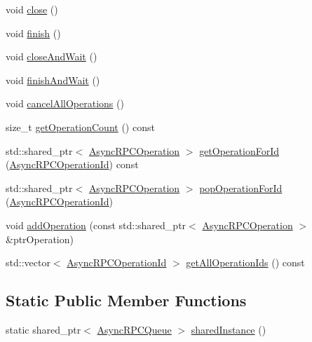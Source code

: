 \begin{DoxyCompactItemize}
\item 
void \mbox{\hyperlink{class_async_r_p_c_queue_a233be6530494331038507ad60f1d8428}{close}} ()
\item 
void \mbox{\hyperlink{class_async_r_p_c_queue_acc9201529321a452826979ea11697b21}{finish}} ()
\item 
void \mbox{\hyperlink{class_async_r_p_c_queue_a1744ae79a6f3ac3cb98404f8a1489cd4}{close\+And\+Wait}} ()
\item 
void \mbox{\hyperlink{class_async_r_p_c_queue_aaa0414a23dee050656280306b9cf1589}{finish\+And\+Wait}} ()
\item 
void \mbox{\hyperlink{class_async_r_p_c_queue_aa22de6b56261448ff6d468e27f630d7b}{cancel\+All\+Operations}} ()
\item 
size\+\_\+t \mbox{\hyperlink{class_async_r_p_c_queue_ab170c29699beeb0f95791953ce2c66d3}{get\+Operation\+Count}} () const
\item 
std\+::shared\+\_\+ptr$<$ \mbox{\hyperlink{class_async_r_p_c_operation}{Async\+R\+P\+C\+Operation}} $>$ \mbox{\hyperlink{class_async_r_p_c_queue_a4d8d32008c611e4cd7ba122a6dda28c6}{get\+Operation\+For\+Id}} (\mbox{\hyperlink{asyncrpcoperation_8h_a1fb3337bad8503e6f6823aa1bcd7191c}{Async\+R\+P\+C\+Operation\+Id}}) const
\item 
std\+::shared\+\_\+ptr$<$ \mbox{\hyperlink{class_async_r_p_c_operation}{Async\+R\+P\+C\+Operation}} $>$ \mbox{\hyperlink{class_async_r_p_c_queue_a716d9609df548d21d3bd3cca130aa811}{pop\+Operation\+For\+Id}} (\mbox{\hyperlink{asyncrpcoperation_8h_a1fb3337bad8503e6f6823aa1bcd7191c}{Async\+R\+P\+C\+Operation\+Id}})
\item 
void \mbox{\hyperlink{class_async_r_p_c_queue_a921166cf7a5f25723c13b2f01d35edaa}{add\+Operation}} (const std\+::shared\+\_\+ptr$<$ \mbox{\hyperlink{class_async_r_p_c_operation}{Async\+R\+P\+C\+Operation}} $>$ \&ptr\+Operation)
\item 
std\+::vector$<$ \mbox{\hyperlink{asyncrpcoperation_8h_a1fb3337bad8503e6f6823aa1bcd7191c}{Async\+R\+P\+C\+Operation\+Id}} $>$ \mbox{\hyperlink{class_async_r_p_c_queue_abca893fa7d90594a7807548c15aa1020}{get\+All\+Operation\+Ids}} () const
\end{DoxyCompactItemize}
\subsection*{Static Public Member Functions}
\begin{DoxyCompactItemize}
\item 
static shared\+\_\+ptr$<$ \mbox{\hyperlink{class_async_r_p_c_queue}{Async\+R\+P\+C\+Queue}} $>$ \mbox{\hyperlink{class_async_r_p_c_queue_a58fbaf8e8a9d3dfbc22dfc62651cd781}{shared\+Instance}} ()
\end{DoxyCompactItemize}
